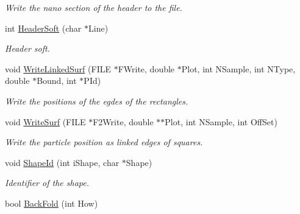 \begin{DoxyCompactItemize}
\begin{DoxyCompactList}\small\item\em \-Write the nano section of the header to the file. \end{DoxyCompactList}\item 
\hypertarget{classVarData_ad86f36df8d1ff2f5c4e8f9bf3e43dfa3}{int \hyperlink{classVarData_ad86f36df8d1ff2f5c4e8f9bf3e43dfa3}{\-Header\-Soft} (char $\ast$\-Line)}\label{classVarData_ad86f36df8d1ff2f5c4e8f9bf3e43dfa3}

\begin{DoxyCompactList}\small\item\em \-Header soft. \end{DoxyCompactList}\item 
\hypertarget{classVarData_afaf46d635173dcc718ad3eb8870d4b91}{void \hyperlink{classVarData_afaf46d635173dcc718ad3eb8870d4b91}{\-Write\-Linked\-Surf} (\-F\-I\-L\-E $\ast$\-F\-Write, double $\ast$\-Plot, int \-N\-Sample, int \-N\-Type, double $\ast$\-Bound, int $\ast$\-P\-Id)}\label{classVarData_afaf46d635173dcc718ad3eb8870d4b91}

\begin{DoxyCompactList}\small\item\em \-Write the positions of the egdes of the rectangles. \end{DoxyCompactList}\item 
\hypertarget{classVarData_a05977dbae3f034b4371646d6c1afbdcd}{void \hyperlink{classVarData_a05977dbae3f034b4371646d6c1afbdcd}{\-Write\-Surf} (\-F\-I\-L\-E $\ast$\-F2\-Write, double $\ast$$\ast$\-Plot, int \-N\-Sample, int \-Off\-Set)}\label{classVarData_a05977dbae3f034b4371646d6c1afbdcd}

\begin{DoxyCompactList}\small\item\em \-Write the particle position as linked edges of squares. \end{DoxyCompactList}\item 
\hypertarget{classVarData_a3043b04de19ff9f50f6253ecbdf316bd}{void \hyperlink{classVarData_a3043b04de19ff9f50f6253ecbdf316bd}{\-Shape\-Id} (int i\-Shape, char $\ast$\-Shape)}\label{classVarData_a3043b04de19ff9f50f6253ecbdf316bd}

\begin{DoxyCompactList}\small\item\em \-Identifier of the shape. \end{DoxyCompactList}\item 
\hypertarget{classVarData_a76c0ae2bedaaafb3da1cb7019035b602}{bool \hyperlink{classVarData_a76c0ae2bedaaafb3da1cb7019035b602}{\-Back\-Fold} (int \-How)}\label{classVarData_a76c0ae2bedaaafb3da1cb7019035b602}


\end{DoxyCompactItemize}
